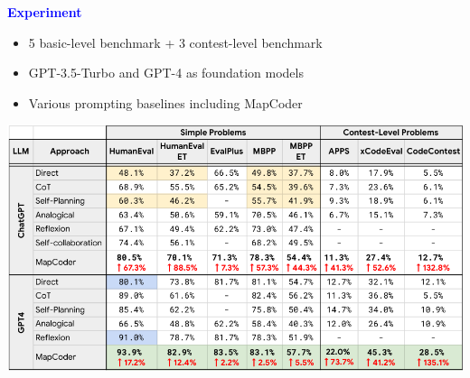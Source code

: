 \documentclass[professionalfont]{beamer}
\begin{document}
\begin{frame}
\begin{center}
    { \textbf{\textcolor{blue}{ {\fontsize{12}{14}\selectfont Experiment} }} }
\end{center}

{\fontsize{10}{14}\selectfont 
\begin{itemize}
    \item 5 basic-level benchmark + 3 contest-level benchmark
    \item GPT-3.5-Turbo and GPT-4 as foundation models
    \item Various prompting baselines including MapCoder
\end{itemize}
}

\begin{center}
    \includegraphics[width=1.0\textwidth]{table2.png}
\end{center}

\end{frame}
\end{document}

